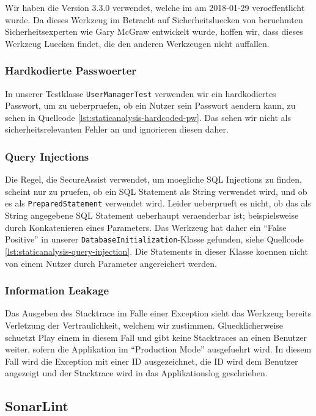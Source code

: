 \documentclass[12pt,DIV14,BCOR10mm,a4paper,twoside,parskip=half-,headsepline,headinclude,english,ngerman,bibliography=totocnumbered]{scrreprt}
\begin{document}
Wir haben die Version 3.3.0 verwendet, welche im am 2018-01-29 veroeffentlicht wurde.
Da dieses Werkzeug im Betracht auf Sicherheitsluecken von beruehmten Sicherheitsexperten wie Gary McGraw entwickelt wurde, hoffen wir, dass dieses Werkzeug Luecken findet, die den anderen Werkzeugen nicht auffallen.

\subsubsection{Hardkodierte Passwoerter}

In unserer Testklasse \texttt{UserManagerTest} verwenden wir ein hardkodiertes Passwort, um zu ueberpruefen, ob ein Nutzer sein Passwort aendern kann, zu sehen in Quellcode \ref{lst:staticanalysis-hardcoded-pw}.
Das sehen wir nicht als sicherheitsrelevanten Fehler an und ignorieren diesen daher.

\subsubsection{Query Injections}

Die Regel, die SecureAssist verwendet, um moegliche SQL Injections zu finden, scheint nur zu pruefen, ob ein SQL Statement als String verwendet wird, und ob es als \texttt{PreparedStatement} verwendet wird.
Leider ueberprueft es nicht, ob das als String angegebene SQL Statement ueberhaupt veraenderbar ist; beispielsweise durch Konkatenieren eines Parameters.
Das Werkzeug hat daher ein \enquote{False Positive} in unserer \texttt{DatabaseInitialization}-Klasse gefunden, siehe Quellcode \ref{lst:staticanalysis-query-injection}.
Die Statements in dieser Klasse koennen nicht von einem Nutzer durch Parameter angereichert werden.

\subsubsection{Information Leakage}

Das Ausgeben des Stacktrace im Falle einer Exception sieht das Werkzeug bereits Verletzung der Vertraulichkeit, welchem wir zustimmen.
Gluecklicherweise schuetzt Play einem in diesem Fall und gibt keine Stacktraces an einen Benutzer weiter, sofern die Applikation im \enquote{Production Mode} ausgefuehrt wird.
In diesem Fall wird die Exception mit einer ID ausgezeichnet, die ID wird dem Benutzer angezeigt und der Stacktrace wird in das Applikationslog geschrieben.

\subsection{SonarLint}
\end{document}
